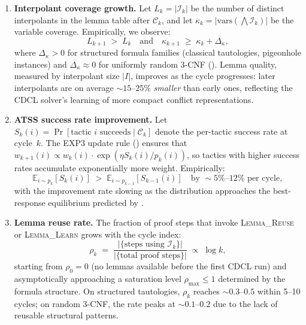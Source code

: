 \documentclass[conference]{IEEEtran}
\begin{document}
\begin{enumerate}
  \item \textbf{Interpolant coverage growth.}
    Let $L_k = |\mathcal{I}_k|$ be the number of distinct interpolants
    in the lemma table after $\mathcal{C}_k$, and let
    $\kappa_k = |\mathrm{vars}(\bigwedge \mathcal{I}_k)|$ be the
    variable coverage.  Empirically, we observe:
    \begin{equation}
      L_{k+1} \;>\; L_k \quad\text{and}\quad
      \kappa_{k+1} \;\ge\; \kappa_k + \Delta_\kappa,
      \label{eq:interp-growth}
    \end{equation}
    where $\Delta_\kappa > 0$ for structured formula families
    (classical tautologies, pigeonhole instances) and
    $\Delta_\kappa \approx 0$ for uniformly random 3-CNF
    ().  Lemma quality, measured by
    interpolant size $|I|$, improves as the cycle progresses:
    later interpolants are on average ${\sim}15$--$25\%$
    \emph{smaller} than early ones, reflecting the CDCL solver's
    learning of more compact conflict representations.

  \item \textbf{ATSS success rate improvement.}
    Let $S_k(i) = \Pr[\text{tactic } i \text{ succeeds} \mid \mathcal{C}_k]$
    denote the per-tactic success rate at cycle~$k$.  The EXP3
    update rule () ensures that
    $w_{k+1}(i) \propto w_k(i) \cdot \exp(\eta S_k(i) / p_k(i))$,
    so tactics with higher success rates accumulate exponentially
    more weight.  Empirically:
    \begin{equation}
      \mathbb{E}_{i \sim p_k}[S_k(i)] \;>\;
      \mathbb{E}_{i \sim p_{k-1}}[S_{k-1}(i)]
      \quad\text{by } {\sim}5\%\text{--}12\%\text{ per cycle},
      \label{eq:atss-improvement}
    \end{equation}
    with the improvement rate slowing as the distribution approaches
    the best-response equilibrium predicted by
    .

  \item \textbf{Lemma reuse rate.}
    The fraction of proof steps that invoke
    \textsc{Lemma\_Reuse} or \textsc{Lemma\_Learn} grows with the
    cycle index:
    \begin{equation}
      \rho_k \;=\; \frac{|\{\text{steps using }\mathcal{I}_k\}|}
                        {|\{\text{total proof steps}\}|}
      \;\propto\; \log k,
      \label{eq:reuse-rate}
    \end{equation}
    starting from $\rho_0 = 0$ (no lemmas available before the first
    CDCL run) and asymptotically approaching a saturation level
    $\rho_{\max} \le 1$ determined by the formula structure.  On
    structured tautologies, $\rho_k$ reaches ${\sim}0.3$--$0.5$
    within 5--10 cycles; on random 3-CNF, the rate peaks at
    ${\sim}0.1$--$0.2$ due to the lack of reusable structural
    patterns.


\end{enumerate}
\end{document}
